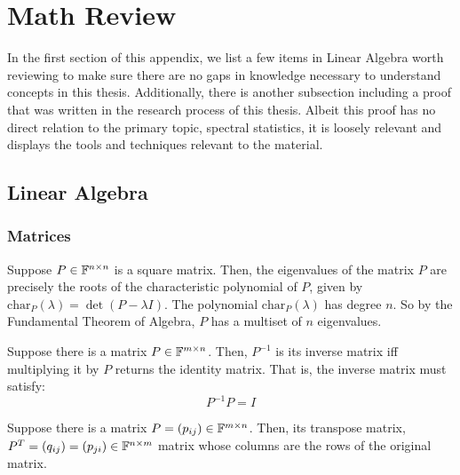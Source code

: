 \chapter{Math Review}

\noindent In the first section of this appendix, we list a few items in Linear Algebra worth reviewing to make sure there are no gaps in knowledge necessary to understand concepts in this thesis. Additionally, there is another subsection including a proof that was written in the research process of this thesis. Albeit this proof has no direct relation to the primary topic, spectral statistics, it is loosely relevant and displays the tools and techniques relevant to the material.

\section{Linear Algebra}
\subsection{Matrices}
\begin{definition}[Eigenvalue]
Suppose $P \in \mathbb{F}^{n \times n}$ is a square matrix. Then, the eigenvalues of the matrix $P$ are precisely the roots of the characteristic polynomial of $P$, given by $\text{char}_P(\lambda) = \det(P - \lambda I)$. The polynomial $\text{char}_P(\lambda)$ has degree $n$. So by the Fundamental Theorem of Algebra, $P$ has a multiset of $n$ eigenvalues.
\end{definition}


\begin{definition}
Suppose there is a matrix $P \in \mathbb{F}^{m\times n}$. Then, $P^{-1}$ is its inverse matrix iff multiplying it by $P$ returns the identity matrix. That is, the inverse matrix must satisfy:
$$ P^{-1} P = I$$
\end{definition}

\begin{definition}
Suppose there is a matrix $P = (p_{ij}) \in \mathbb{F}^{m\times n}$. Then, its transpose matrix, $P^{T} = (q_{ij}) = (p_{ji}) \in \mathbb{F}^{n\times m}$ matrix whose columns are the rows of the original matrix.
\end{definition}

